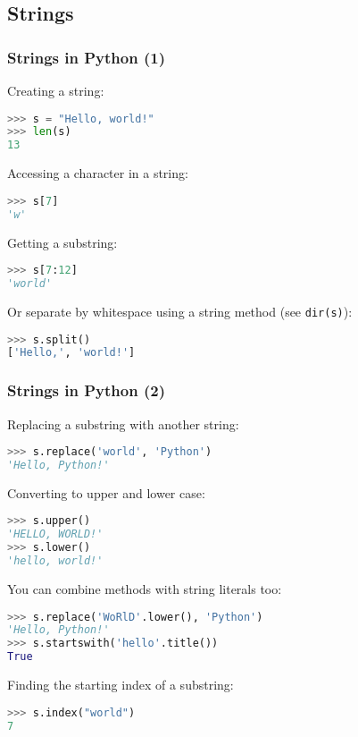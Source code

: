 \subsection{Strings}
\begin{frame}[fragile]
  \frametitle{Strings in Python (1)}
  Creating a string:
  \begin{lstlisting}[language=Python,numbers=none]
>>> s = "Hello, world!"
>>> len(s)
13
  \end{lstlisting}
  Accessing a character in a string:
  \begin{lstlisting}[language=Python,numbers=none]
>>> s[7]
'w'
  \end{lstlisting}
  Getting a substring:
  \begin{lstlisting}[language=Python,numbers=none]
>>> s[7:12]
'world'
  \end{lstlisting}
  Or separate by whitespace using a string method (see \lstinline|dir(s)|):
  \begin{lstlisting}[language=Python,numbers=none]
>>> s.split()
['Hello,', 'world!']
  \end{lstlisting}
\end{frame}

\begin{frame}[fragile]
  \frametitle{Strings in Python (2)}
  Replacing a substring with another string:
  \begin{lstlisting}[language=Python,numbers=none]
>>> s.replace('world', 'Python')
'Hello, Python!'
  \end{lstlisting}
  Converting to upper and lower case:
  \begin{lstlisting}[language=Python,numbers=none]
>>> s.upper()
'HELLO, WORLD!'
>>> s.lower()
'hello, world!'
  \end{lstlisting}
  You can combine methods with string literals too:
  \begin{lstlisting}[language=Python,numbers=none]
>>> s.replace('WoRlD'.lower(), 'Python')
'Hello, Python!'
>>> s.startswith('hello'.title())
True
  \end{lstlisting}
  Finding the starting index of a substring:
  \begin{lstlisting}[language=Python,numbers=none]
>>> s.index("world")
7
  \end{lstlisting}
\end{frame}

